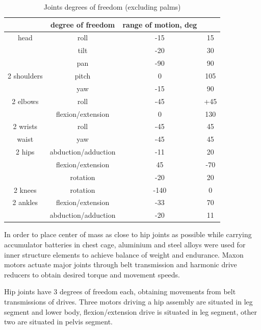 \documentclass[letterpaper, 10 pt, conference]{ieeeconf}  %
\begin{document}
\begin{table}[thpb]
    \caption{Joints degrees of freedom (excluding palms)}
    \label{tbl:DOFTable}
    \begin{center}
    \begin{tabular}{c | c c c}
        & degree of freedom & range of motion, deg & \\
    \hline
        head & roll & -15 & 15 \\
            & tilt & -20 & 30 \\
            & pan & -90 & 90 \\
    \hline
        2 shoulders &  pitch & 0 & 105\\
                & yaw & -15 & 90\\
    \hline
        2 elbows & roll & -45 & +45 \\
                & flexion/extension & 0 & 130\\ 
    \hline
        2 wrists & roll & -45 & 45 \\
    \hline
        waist & yaw & -45 & 45 \\
    \hline
        2 hips & abduction/adduction & -11 & 20 \\
            & flexion/extension & 45 & -70 \\
            & rotation &-20 & 20\\
    \hline
        2 knees & rotation & -140 & 0 \\
    \hline
        2 ankles & flexion/extension & -33 & 70 \\
            & abduction/adduction & -20 & 11\\            
    \end{tabular}
    \end{center}
\end{table}

In order to place center of mass as close to hip joints as possible while
carrying accumulator batteries in chest cage, aluminium and steel alloys were
used for inner structure elements to achieve balance of weight and
endurance.
Maxon motors actuate major joints through belt transmission and harmonic drive
reducers to obtain desired torque and movement speeds.

Hip joints have 3 degrees of freedom each, obtaining movements from belt
transmissions of drives. Three motors driving a hip assembly are
situated in leg segment and lower body, flexion/extension drive is situated
in leg segment, other two are situated in pelvis segment.
\end{document}
